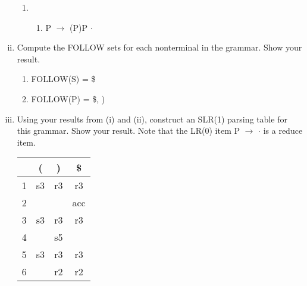 \documentclass{article}
\begin{document}
\begin{enumerate}[i.]
\begin{enumerate}[(1)]
			\item \begin{enumerate}[]
				\item P $\to$ (P)P $\cdot$
			\end{enumerate}
		\end{enumerate}

	\item Compute the FOLLOW sets for each nonterminal in the grammar. Show
		your result.

		\begin{enumerate}[(1)]
			\item FOLLOW(S) = \$
			\item FOLLOW(P) = \$, )
		\end{enumerate}

	\item Using your results from (i) and (ii), construct an SLR(1) parsing
		table for this grammar. Show your result. Note that the LR(0)
		item P $\to$ $\cdot$ is a reduce item.

		\begin{tabular}{|c|c|c|c|}
		                             \hline
			  &  ( &  ) & \$  \\ \hline
			1 & s3 & r3 & r3  \\ \hline
			2 &    &    & acc \\ \hline
			3 & s3 & r3 & r3  \\ \hline
			4 &    & s5 &     \\ \hline
			5 & s3 & r3 & r3  \\ \hline
			6 &    & r2 & r2  \\ \hline
		\end{tabular}
\end{enumerate}
\end{document}
